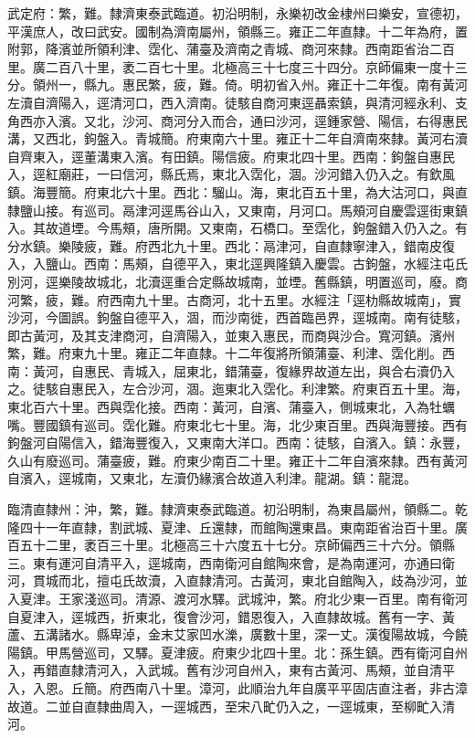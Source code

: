 \begin{pinyinscope}
武定府：繁，難。隸濟東泰武臨道。初沿明制，永樂初改金棣州曰樂安，宣德初，平漢庶人，改曰武安。國制為濟南屬州，領縣三。雍正二年直隸。十二年為府，置附郭，降濱並所領利津、霑化、蒲臺及濟南之青城、商河來隸。西南距省治二百里。廣二百八十里，袤二百七十里。北極高三十七度三十四分。京師偏東一度十三分。領州一，縣九。惠民繁，疲，難。倚。明初省入州。雍正十二年復。南有黃河左瀆自濟陽入，逕清河口，西入濟南。徒駭自商河東逕聶索鎮，與清河經永利、支角西亦入濱。又北，沙河、商河分入而合，通曰沙河，逕鍾家營、陽信，右得惠民溝，又西北，鉤盤入。青城簡。府東南六十里。雍正十二年自濟南來隸。黃河右瀆自齊東入，逕董溝東入濱。有田鎮。陽信疲。府東北四十里。西南：鉤盤自惠民入，逕紅廟莊，一曰信河，縣氏焉，東北入霑化，涸。沙河錯入仍入之。有欽風鎮。海豐簡。府東北六十里。西北：騮山。海，東北百五十里，為大沽河口，與直隸鹽山接。有巡司。鬲津河逕馬谷山入，又東南，月河口。馬頰河自慶雲逕街東鎮入。其故道堙。今馬頰，唐所開。又東南，石橋口。至霑化，鉤盤錯入仍入之。有分水鎮。樂陵疲，難。府西北九十里。西北：鬲津河，自直隸寧津入，錯南皮復入，入鹽山。西南：馬頰，自德平入，東北逕興隆鎮入慶雲。古鉤盤，水經注屯氏別河，逕樂陵故城北，北瀆逕重合定縣故城南，並堙。舊縣鎮，明置巡司，廢。商河繁，疲，難。府西南九十里。古商河，北十五里。水經注「逕朸縣故城南」，實沙河，今圖誤。鉤盤自德平入，涸，而沙南徙，西首臨邑界，逕城南。南有徒駭，即古黃河，及其支津商河，自濟陽入，並東入惠民，而商與沙合。寬河鎮。濱州繁，難。府東九十里。雍正二年直隸。十二年復將所領蒲臺、利津、霑化削。西南：黃河，自惠民、青城入，屈東北，錯蒲臺，復緣界故道左出，與合右瀆仍入之。徒駭自惠民入，左合沙河，涸。迤東北入霑化。利津繁。府東百五十里。海，東北百六十里。西與霑化接。西南：黃河，自濱、蒲臺入，側城東北，入為牡蠣嘴。豐國鎮有巡司。霑化難。府東北七十里。海，北少東百里。西與海豐接。西有鉤盤河自陽信入，錯海豐復入，又東南大洋口。西南：徒駭，自濱入。鎮：永豐，久山有廢巡司。蒲臺疲，難。府東少南百二十里。雍正十二年自濱來隸。西有黃河自濱入，逕城南，又東北，左瀆仍緣濱合故道入利津。龍湖。鎮：龍混。

臨清直隸州：沖，繁，難。隸濟東泰武臨道。初沿明制，為東昌屬州，領縣二。乾隆四十一年直隸，割武城、夏津、丘還隸，而館陶還東昌。東南距省治百十里。廣百五十二里，袤百三十里。北極高三十六度五十七分。京師偏西三十六分。領縣三。東有運河自清平入，逕城南，西南衛河自館陶來會，是為南運河，亦通曰衛河，貫城而北，擅屯氏故瀆，入直隸清河。古黃河，東北自館陶入，歧為沙河，並入夏津。王家淺巡司。清源、渡河水驛。武城沖，繁。府北少東一百里。南有衛河自夏津入，逕城西，折東北，復會沙河，錯恩復入，入直隸故城。舊有一字、黃蘆、五溝諸水。縣卑淖，金末艾家凹水濼，廣數十里，深一丈。漢復陽故城，今饒陽鎮。甲馬營巡司，又驛。夏津疲。府東少北四十里。北：孫生鎮。西有衛河自州入，再錯直隸清河入，入武城。舊有沙河自州入，東有古黃河、馬頰，並自清平入，入恩。丘簡。府西南八十里。漳河，此順治九年自廣平平固店直注者，非古漳故道。二並自直隸曲周入，一逕城西，至宋八甿仍入之，一逕城東，至柳甿入清河。


\end{pinyinscope}

